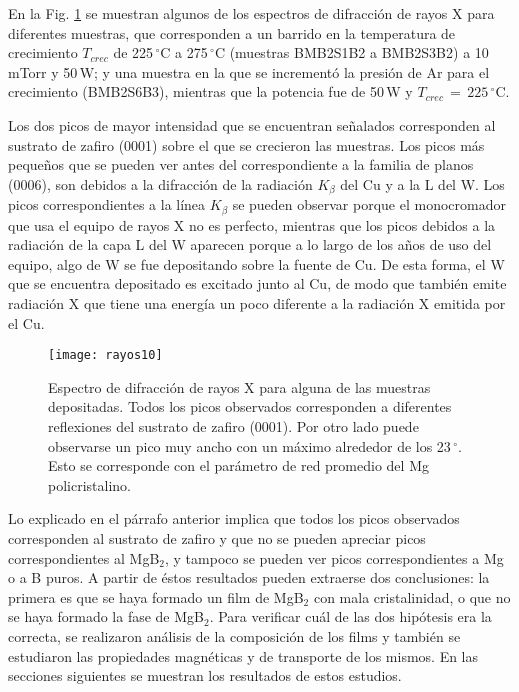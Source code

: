 En la Fig. \ref{fig:rayos10} se muestran algunos de los espectros de difracción de rayos X para diferentes muestras, que corresponden a un barrido en la temperatura de crecimiento $T_{crec}$ de 225\,$^{\circ}$C a 275\,$^{\circ}$C (muestras BMB2S1B2 a BMB2S3B2) a 10\,mTorr y 50\,W; y una muestra en la que se incrementó la presión de Ar para el crecimiento (BMB2S6B3), mientras que la potencia fue de 50\,W y $T_{crec}\,=\,225$\,$^{\circ}$C.

Los dos picos de mayor intensidad que se encuentran señalados corresponden al sustrato de zafiro (0001) sobre el que se crecieron las muestras. Los picos más pequeños que se pueden ver antes del correspondiente a la familia de planos (0006), son debidos a la difracción de la radiación $K_{\beta}$ del Cu y a la L del W. Los picos correspondientes a la línea $K_{\beta}$ se pueden observar porque el monocromador que usa el equipo de rayos X no es perfecto, mientras que los picos debidos a la radiación de la capa L del W aparecen porque a lo largo de los años de uso del equipo, algo de W se fue depositando sobre la fuente de Cu. De esta forma, el W que se encuentra depositado es excitado junto al Cu, de modo que también emite radiación X que tiene una energía un poco diferente a la radiación X emitida por el Cu. 
\begin{figure}[tbh!]
 \begin{center}
    \texttt{[image: rayos10]}
  \end{center}
  \caption[Espectro de difracción de rayos X para alguna de las muestras depositadas por sputterong.]{Espectro de difracción de rayos X para alguna de las muestras depositadas. Todos los picos observados corresponden a diferentes reflexiones del sustrato de zafiro (0001). Por otro lado puede observarse un pico muy ancho con un máximo alrededor de los 23\,$^{\circ}$. Esto se corresponde con el parámetro de red promedio del Mg policristalino.}
\label{fig:rayos10}
\end{figure}

Lo explicado en el párrafo anterior implica que todos los picos observados co\-rres\-pon\-den al sustrato de zafiro y que no se pueden apreciar picos correspondientes al MgB$_{2}$, y tampoco se pueden ver picos correspondientes a Mg o a B puros. A partir de éstos resultados pueden extraerse dos conclusiones: la primera es que se haya formado un film de MgB$_{2}$ con mala cristalinidad, o que no se haya formado la fase de MgB$_{2}$. Para verificar cuál de las dos hipótesis era la correcta, se realizaron análisis de la composición de los films y también se estudiaron las propiedades magnéticas y de transporte de los mismos. En las secciones siguientes se muestran los resultados de estos estudios.
